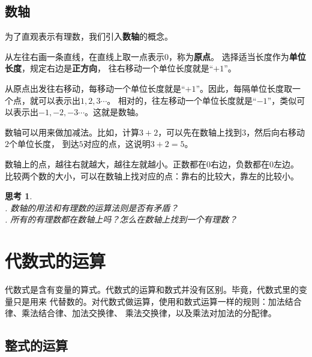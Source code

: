 \documentclass[12pt,UTF8]{ctexbook}
\newtheorem{sk}{思考}[section]
\begin{document}
\section{数轴}
为了直观表示有理数，我们引入\textbf{数轴}的概念。

从左往右画一条直线，在直线上取一点表示$0$，称为\textbf{原点}。
选择适当长度作为\textbf{单位长度}，规定右边是\textbf{正方向}，
往右移动一个单位长度就是“$+1$”。

从原点出发往右移动，每移动一个单位长度就是“$+1$”。因此，每隔单位长度取一个点，就可以表示出$1,2,3\cdots$。
相对的，往左移动一个单位长度就是“$-1$”，类似可以表示出$-1,-2,-3\cdots$。这就是数轴。

数轴可以用来做加减法。比如，计算$3+2$，可以先在数轴上找到$3$，然后向右移动$2$个单位长度，
到达$5$对应的点，这说明$3+2=5$。

数轴上的点，越往右就越大，越往左就越小。正数都在$0$右边，负数都在$0$左边。
比较两个数的大小，可以在数轴上找对应的点：靠右的比较大，靠左的比较小。

\begin{sk}\label{sk:3-2-0}
    \mbox{} \\
    . 数轴的用法和有理数的运算法则是否有矛盾？\\
    . 所有的有理数都在数轴上吗？怎么在数轴上找到一个有理数？
\end{sk}

\chapter{代数式的运算}
代数式是含有变量的算式。代数式的运算和数式并没有区别。毕竟，代数式里的变量只是用来
代替数的。对代数式做运算，使用和数式运算一样的规则：加法结合律、乘法结合律、加法交换律、
乘法交换律，以及乘法对加法的分配律。

\section{整式的运算}
\end{document}
